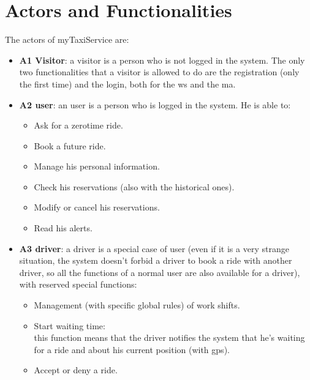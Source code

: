 \section{Actors and Functionalities}
The actors of myTaxiService are:
\begin{itemize}
	
	\item \textbf{A1 Visitor}: a visitor is a person who is not logged in the system. The only two functionalities that a visitor is allowed to do are the registration (only the first time) and the login, both for the \gls{ws} and the \gls{ma}.
	
	\item \textbf{A2 \Gls{user}}: an \gls{user} is a person who is logged in the system. He is able to:
	\begin{itemize}
		\item Ask for a \gls{zerotime} \gls{ride}.
		\item Book a \gls{future} \gls{ride}.
		\item Manage his personal information.
		\item Check his \glspl{reservation} (also with the historical ones).
		\item Modify or cancel his \glspl{reservation}.
		\item Read his \glspl{alert}.
	\end{itemize}
	
	\item \textbf{A3 \Gls{driver}}: a \gls{driver} is a special case of \gls{user} (even if it is a very strange situation, the system doesn't forbid a \gls{driver} to book a \gls{ride} with another \gls{driver}, so all the functions of a normal \gls{user} are also available for a \gls{driver}), with reserved special functions:
	\begin{itemize}
		\item Management (with specific global rules) of work shifts.
		\item Start waiting time:\\
		this function means that the \gls{driver} notifies the system that he's waiting for a \gls{ride} and about his current position (with \gls{gps}). 	
		\item Accept or deny a \gls{ride}.
	\end{itemize}
	

\end{itemize}
